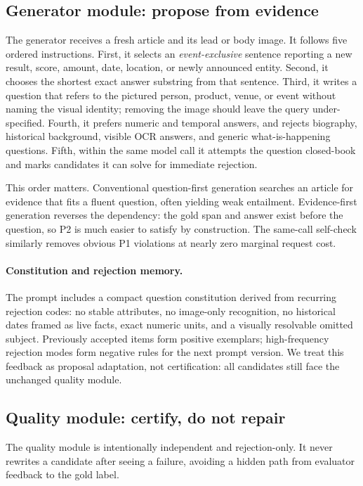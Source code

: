 \documentclass{article}
\begin{document}
\subsection{Generator module: propose from evidence}
The generator receives a fresh article and its lead or body image.
It follows five ordered instructions.
First, it selects an \emph{event-exclusive} sentence reporting a new result,
score, amount, date, location, or newly announced entity.
Second, it chooses the shortest exact answer substring from that sentence.
Third, it writes a question that refers to the pictured person, product,
venue, or event without naming the visual identity; removing the image should
leave the query under-specified.
Fourth, it prefers numeric and temporal answers, and rejects biography,
historical background, visible OCR answers, and generic what-is-happening
questions.
Fifth, within the same model call it attempts the question closed-book and
marks candidates it can solve for immediate rejection.

This order matters.
Conventional question-first generation searches an article for evidence that
fits a fluent question, often yielding weak entailment.
Evidence-first generation reverses the dependency: the gold span and answer
exist before the question, so P2 is much easier to satisfy by construction.
The same-call self-check similarly removes obvious P1 violations at nearly
zero marginal request cost.

\paragraph{Constitution and rejection memory.}
The prompt includes a compact question constitution derived from recurring
rejection codes: no stable attributes, no image-only recognition, no
historical dates framed as live facts, exact numeric units, and a visually
resolvable omitted subject.
Previously accepted items form positive exemplars; high-frequency rejection
modes form negative rules for the next prompt version.
We treat this feedback as proposal adaptation, not certification: all
candidates still face the unchanged quality module.

\subsection{Quality module: certify, do not repair}
The quality module is intentionally independent and rejection-only.
It never rewrites a candidate after seeing a failure, avoiding a hidden path
from evaluator feedback to the gold label.
\end{document}
